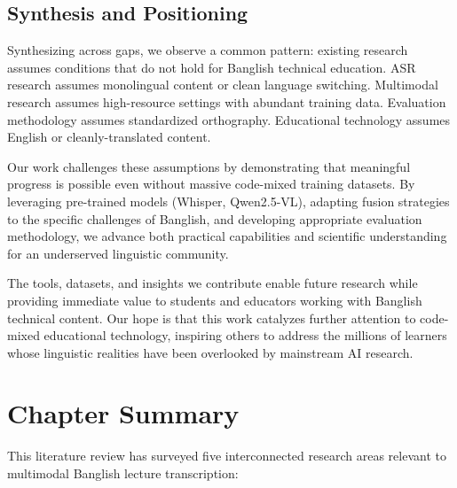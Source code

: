 \subsection{Synthesis and Positioning}

Synthesizing across gaps, we observe a common pattern: existing research assumes conditions that do not hold for Banglish technical education. ASR research assumes monolingual content or clean language switching. Multimodal research assumes high-resource settings with abundant training data. Evaluation methodology assumes standardized orthography. Educational technology assumes English or cleanly-translated content.

Our work challenges these assumptions by demonstrating that meaningful progress is possible even without massive code-mixed training datasets. By leveraging pre-trained models (Whisper, Qwen2.5-VL), adapting fusion strategies to the specific challenges of Banglish, and developing appropriate evaluation methodology, we advance both practical capabilities and scientific understanding for an underserved linguistic community.

The tools, datasets, and insights we contribute enable future research while providing immediate value to students and educators working with Banglish technical content. Our hope is that this work catalyzes further attention to code-mixed educational technology, inspiring others to address the millions of learners whose linguistic realities have been overlooked by mainstream AI research.

\section{Chapter Summary}

This literature review has surveyed five interconnected research areas relevant to multimodal Banglish lecture transcription:

